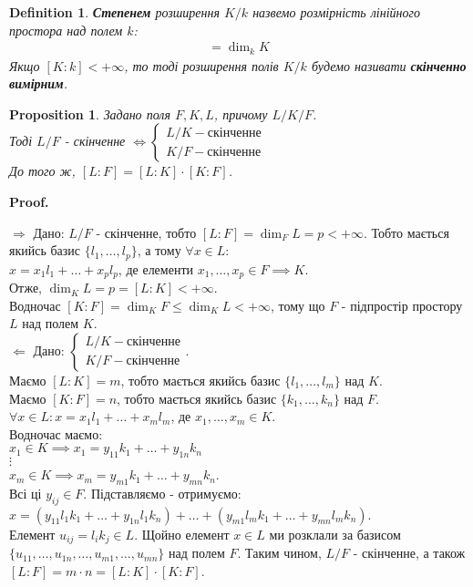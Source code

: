 \documentclass[a4paper, 14pt]{extarticle}
\makeatletter
\theoremstyle{theoremdd}
\theoremstyle{theoremdd}
\newtheorem{definition}[theorem]{Definition}
\theoremstyle{theoremdd}
\theoremstyle{theoremdd}
\theoremstyle{theoremdd}
\newtheorem{proposition}[theorem]{Proposition}
\theoremstyle{theoremdd}
\theoremstyle{theoremdd}
\theoremstyle{theoremdd}
\def\qed{$\blacksquare$}
\def\rightproof{$\boxed{\Rightarrow}$ }
\def\leftproof{$\boxed{\Leftarrow}$ }
\renewenvironment{proof}[1][Proof.\\]{\par
\pushQED{\hfill \qed}%
\normalfont \topsep6\p@\@plus6\p@\relax
\trivlist
\item\relax
{\bfseries
#1\@addpunct{.}}\hspace\labelsep\ignorespaces
}{%
\popQED\endtrivlist\@endpefalse
}
\makeatother
\begin{document}
\begin{definition}
\textbf{Степенем} розширення $K/k$ назвемо розмірність лінійного простора над полем $k$:
\begin{align*}
[K:k] = \dim_k K
\end{align*}
Якщо $[K:k] < +\infty$, то тоді розширення полів $K/k$ будемо називати \textbf{скінченно вимірним}.
\end{definition}

\begin{proposition}
Задано поля $F,K,L$, причому $L/K/F$.\\
Тоді $L/F$ - скінченне $\iff \begin{cases} L/K - \text{скінченне} \\ K/F - \text{скінченне} \end{cases}$\\
До того ж, $[L:F] = [L:K] \cdot [K:F]$.
\end{proposition}

\begin{proof}
\rightproof Дано: $L/F$ - скінченне, тобто $[L:F] = \dim_F L = p < +\infty$. Тобто мається якийсь базис $\{l_1,\dots,l_p\}$, а тому $\forall x \in L:$\\
$x = x_1 l_1 + \dots + x_p l_p$, де елементи $x_1,\dots,x_p \in F \implies K$.\\
Отже, $\dim_K L = p = [L : K] < +\infty$.\\
Водночас $[K: F] = \dim_K F \leq \dim_K L < +\infty$, тому що $F$ - підпростір простору $L$ над полем $K$.
\bigskip \\
\leftproof Дано: $\begin{cases} L/K - \text{скінченне} \\ K/F - \text{скінченне} \end{cases}$.\\
Маємо $[L:K] = m$, тобто мається якийсь базис $\{l_1,\dots,l_m\}$ над $K$.\\
Маємо $[K:F] = n$, тобто мається якийсь базис $\{k_1,\dots,k_n\}$ над $F$.\\
$\forall x \in L: x = x_1 l_1 + \dots + x_m l_m$, де $x_1,\dots,x_m \in K$.\\
Водночас маємо:\\
$x_1 \in K \implies x_1 = y_{11}k_1 + \dots + y_{1n}k_n$\\
$\vdots$\\
$x_m \in K \implies x_m = y_{m1}k_1 + \dots + y_{mn}k_n$.\\
Всі ці $y_{ij} \in F$. Підставляємо - отримуємо:\\
$x = (y_{11}l_1k_1 + \dots + y_{1n}l_1k_n) + \dots + (y_{m1}l_mk_1 + \dots + y_{mn}l_m k_n)$.\\
Елемент $u_{ij} = l_i k_j \in L$. Щойно елемент $x \in L$ ми розклали за базисом $\{u_{11},\dots,u_{1n},\dots,u_{m1},\dots,u_{mn}\}$ над полем $F$. Таким чином, $L/F$ - скінченне, а також\\
$[L:F] = m \cdot n = [L:K] \cdot [K:F]$.
\end{proof}
\end{document}
